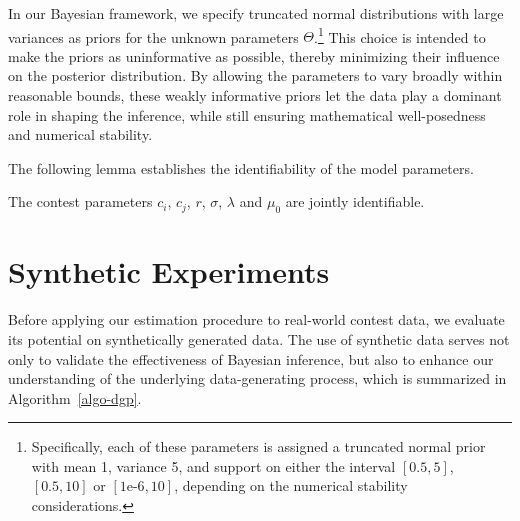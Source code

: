 \documentclass[mnsc]{informs3}
\begin{document}
In our Bayesian framework, we specify truncated normal distributions with large variances as priors for the unknown parameters $\Theta$.\footnote{Specifically, each of these parameters is assigned a truncated normal prior with mean 1, variance 5, and support on either the interval $[0.5, 5]$, $[0.5, 10]$ or $[\text{1e-6}, 10]$, depending on the numerical stability considerations.}
This choice is intended to make the priors as uninformative as possible, thereby minimizing their influence on the posterior distribution. 
By allowing the parameters to vary broadly within reasonable bounds, these weakly informative priors let the data play a dominant role in shaping the inference, while still ensuring mathematical well-posedness and numerical stability.

The following lemma establishes the identifiability of the model parameters.

\begin{lemma}\label{lmm-params-identifiability}
The contest parameters $c_i$, $c_j$, $r$, $\sigma$, $\lambda$ and $\mu_0$ are jointly identifiable. 
\end{lemma}




\section{Synthetic Experiments}

Before applying our estimation procedure to real-world contest data, we evaluate its potential on synthetically generated data. 
The use of synthetic data serves not only to validate the effectiveness of Bayesian inference, but also to enhance our understanding of the underlying data-generating process, which is summarized in Algorithm~\ref{algo-dgp}. 
\end{document}
